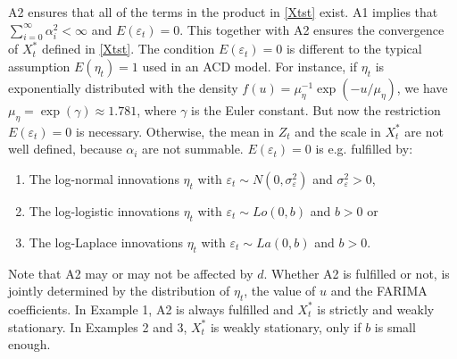 \documentclass[12pt]{article}
\begin{document}
A2 ensures that all of the terms in the product in \eqref{Xtst} exist. A1 implies that $\sum_{i=0}^\infty\alpha_i^2<\infty$ and $E(\varepsilon_t)=0$. This together with A2 ensures the convergence of $X_t^*$ defined in \eqref{Xtst}. The condition $E(\varepsilon_t)=0$ is different to the typical assumption $E(\eta_t)=1$ used in an ACD model. For instance, if $\eta_t$ is exponentially distributed with the density $f(u)=\mu_\eta^{-1}\exp(-u/\mu_\eta)$, we have $\mu_\eta=\exp(\gamma)\approx 1.781$, where $\gamma$ is the Euler constant. 
But now the restriction $E(\varepsilon_t)=0$ is necessary. Otherwise, the mean in $Z_t$ and the scale in $X_t^*$ are not well defined, because $\alpha_i$ are not summable. $E(\varepsilon_t)=0$ is  e.g. fulfilled by:
\begin{enumerate}
\item[]\hspace*{-.5cm}{\bf Example 1.} The log-normal innovations $\eta_t$ with $\varepsilon_t\sim N(0, \sigma_\varepsilon^2)$ and $\sigma_\varepsilon^2>0$,
\item[]\hspace*{-.5cm}{\bf Example 2.} The log-logistic innovations $\eta_t$ with $\varepsilon_t\sim Lo(0, b)$ and $b>0$ or
\item[]\hspace*{-.5cm}{\bf Example 3.} The log-Laplace innovations $\eta_t$ with $\varepsilon_t\sim La(0, b)$ and $b>0$.
\end{enumerate}
Note that A2 may or may not be affected by $d$. Whether A2 is fulfilled or not, is jointly determined by the distribution of $\eta_t$, the value of $u$ and the FARIMA coefficients. In Example 1, A2 is always fulfilled and $X_t^*$ is strictly and weakly stationary. In Examples 2 and 3, $X_t^*$ is weakly stationary, only if $b$ is small enough.
\end{document}
